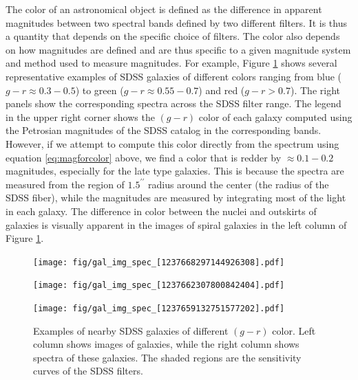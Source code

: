 The color of an astronomical object is defined as the difference in apparent magnitudes between two spectral bands defined by two different filters. It is thus a quantity that depends on the specific choice of filters. The color also depends on how magnitudes 
are defined and are thus specific to a given magnitude system and method used to measure magnitudes.  For example, Figure \ref{fig:gal_spectra} shows several representative examples of SDSS galaxies of different colors ranging from blue ($g-r\approx 0.3-0.5$) to green ($g-r\approx 0.55-0.7$) and red ($g-r> 0.7$).  The right panels show
the corresponding spectra across the SDSS filter range. The legend in the upper right corner shows the $(g-r)$ color of each galaxy computed using the Petrosian magnitudes of the SDSS catalog in the corresponding bands. However, if we attempt to compute this color directly from the spectrum using equation \ref{eq:magforcolor} above, we find a color that is redder by $\approx 0.1-0.2$ magnitudes, especially for the late type galaxies. This is because the spectra are measured from the region of $1.5^{\prime\prime}$ radius around the center (the radius of the SDSS fiber), while the magnitudes are measured by integrating most of the light in each galaxy. The difference in color between the nuclei and outskirts of galaxies is visually apparent in the images of spiral galaxies in the left column of Figure \ref{fig:gal_spectra}.

\begin{figure}[!ht]
\centerline{
\texttt{[image: fig/gal\_img\_spec\_[1237668297144926308].pdf]}}
\vspace{-3mm}
\centerline{
\texttt{[image: fig/gal\_img\_spec\_[1237662307800842404].pdf]}}
\vspace{-3mm}
\centerline{
\texttt{[image: fig/gal\_img\_spec\_[1237659132751577202].pdf]}}
\caption{Examples of nearby SDSS galaxies of different $(g-r)$ color. Left column shows images of galaxies, while the right column shows  spectra of these galaxies. The shaded regions are the sensitivity curves of the SDSS filters. \label{fig:gal_spectra}}
\end{figure}

